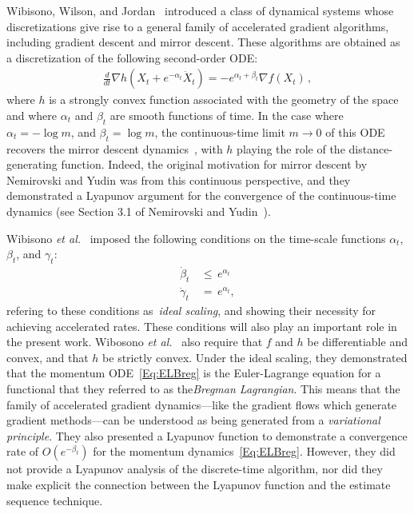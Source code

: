 \documentclass[11pt]{article}
\theoremstyle{plain}
\begin{document}
Wibisono, Wilson, and Jordan~\cite{Acceleration} introduced a class of dynamical systems whose discretizations give rise to a general family of accelerated gradient algorithms, including gradient descent and mirror descent. These algorithms are obtained as a discretization of the following second-order ODE:
 \begin{align} \label{Eq:ELBreg} 
\frac{d}{dt} \nabla h(X_t + e^{-\alpha_t} \dot X_t) = -e^{\alpha_t+\beta_t} \nabla f(X_t)\,,
\end{align}
where $h$ is a strongly convex function associated with the geometry of the space and where $\alpha_t$ and $\beta_t$ are smooth functions of time.  In the case where $\alpha_t=-\log m$, and $\beta_t = \log m$,  the continuous-time limit $m \rightarrow 0$ of this ODE recovers the mirror descent dynamics~\cite[(78)]{Acceleration}, with $h$ playing the role of the distance-generating function.  Indeed, the original motivation for mirror descent by Nemirovski and Yudin was from this continuous perspective, and they demonstrated a Lyapunov argument for the convergence of the continuous-time dynamics (see Section 3.1 of Nemirovski and Yudin~\cite{NemirovskiiYudin}).

Wibisono \emph{et al.}~\cite{Acceleration} imposed the following conditions on the time-scale functions $\alpha_t$, $\beta_t$, and $\gamma_t$:
\begin{subequations}\label{Eq:IdeSca}
\begin{align}
\dot \beta_t \,&\leq\, e^{\alpha_t}   \label{Eq:IdeScaBet} \\
\dot \gamma_t \,&=\, e^{\alpha_t}  \label{Eq:IdeScaGam},
\end{align}
\end{subequations}
refering to these conditions as~\emph{ideal scaling}, and showing their necessity for achieving accelerated rates. These conditions will also play an important role in the present work.  Wibosono {\em et al.}~\cite{Acceleration} also require that  $f$ and $h$ be differentiable and convex, and that $h$ be strictly convex. Under the ideal scaling, they demonstrated that the momentum ODE~\eqref{Eq:ELBreg} is the Euler-Lagrange equation for a functional that they referred to as the{\em Bregman Lagrangian}. This means that the family of accelerated gradient dynamics---like the gradient flows which generate gradient methods---can be understood as being generated from a {\em variational principle}. They also presented a Lyapunov function to demonstrate a convergence rate of $O(e^{-\beta_t})$ for the momentum dynamics~\eqref{Eq:ELBreg}. However, they did not provide a Lyapunov analysis of the discrete-time algorithm, nor did they make explicit the connection between the Lyapunov function and the estimate sequence technique. 
\end{document}
